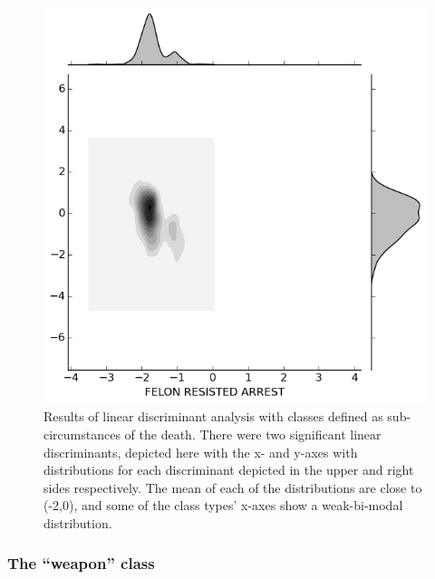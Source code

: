 \documentclass{evanarticle}
\begin{document}
\begin{figure}[H]
\begin{minipage}[b]{0.30\linewidth}
  \end{minipage}
  \quad
  \begin{minipage}[b]{0.30\linewidth}
    \includegraphics[width=\linewidth]{images/subcircum/FELON_RESISTED_ARREST.png}
  \end{minipage}
  \caption{Results of linear discriminant analysis with classes defined as sub-circumstances of the death.  There were two significant linear discriminants, depicted here with the x- and y-axes with distributions for each discriminant depicted in the upper and right sides respectively.  The mean of each of the distributions are close to (-2,0), and some of the class types' x-axes show a weak-bi-modal distribution.}
  \label{fig_sub_circumstance}
\end{figure}

\subsubsection{The ``weapon'' class}
\end{document}
